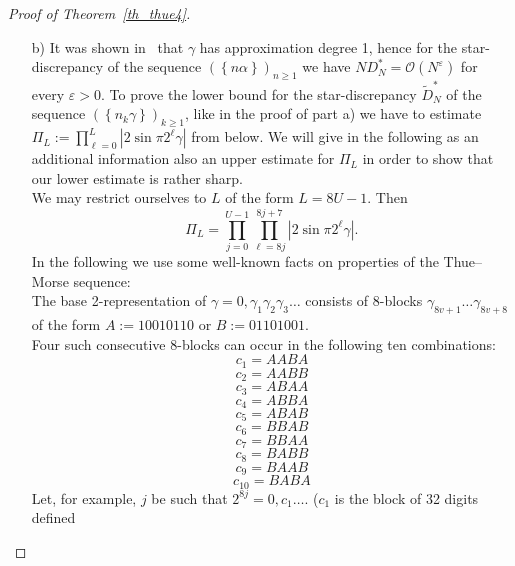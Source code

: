 \documentclass[12pt]{amsart}
\newcommand {\ve} {\varepsilon}
\begin{document}
\begin{proof}[Proof of Theorem~\ref{th_thue4}]
\begin{enumerate}
\noindent Because of $\left|\cos \pi x -1\right| \leq 3x$ and $\left|\sin \pi x\right| \leq \pi x$ for $x \geq 0$ we have 
$$
\left|\cos \pi \delta_{\ell} + \frac{\left(-1\right)^{\ell+1}}{\sqrt{3}} \sin \pi \delta_{\ell} \right| \geq 1- \left(3+ \frac{\pi}{\sqrt{3}}\right) \delta_{\ell} > 1- 5 \delta_{\ell}.
$$
Therefore, noting that $\max (0.2, ~1-5x) > e^{-11x}$ for $x >0$, we also have
\begin{eqnarray*}
\prod^{L}_{\ell=0} \frac{\left|\sin \pi 2^{\ell} \alpha\right|}{\left|\sin \frac{\pi}{3}\right|} & > & \prod^{L}_{\ell=0} \max \left(0.2, ~1-5 \delta_{\ell}\right) \\
& > & e^{-11 \sum^{L}_{\ell=0} \delta_{\ell}} \\
& \gg & e^{-22 \log L}.
\end{eqnarray*}
So
$$
\Pi_{L} \gg \frac{1}{L^{22}} N^{\frac{\log 3}{\log 4}} \gg \frac{1}{\left(\log N\right)^{22}} N^{\frac{\log3}{\log 4}}
$$
and the lower bound for $\widetilde{D}^{*}_{N}$ follows. The upper bound for $\widetilde{D}^{*}_{N}$ follows from~\eqref{BL2} and from the upper bound for $D^{*}_{N}$.\\

\item [b)] It was shown in~\cite{YB} that $\gamma$ has approximation degree 1, hence for the star-discrepancy of the sequence $\left(\left\{n \alpha \right\}\right)_{n \geq 1}$ we have $N D_{N}^{*} = \mathcal{O} \left(N^{\ve}\right)$ for every $\ve >0.$ To prove the lower bound for the star-discrepancy $\widetilde{D}_{N}^{*}$ of the sequence $\left(\left\{n_{k} \gamma\right\}\right)_{k \geq 1}$, like in the proof of part a) we have to estimate $\Pi_{L} := \prod^{L}_{\ell=0} \left|2 \sin \pi 2^{\ell} \gamma \right|$ from below. We will give in the following as an additional information also an upper estimate for $\Pi_{L}$ in order to show that our lower estimate is rather sharp.\\
We may restrict ourselves to $L$ of the form $L= 8 U -1$. Then
$$
\Pi_{L} = \prod^{U-1}_{j=0} \prod^{8j +7}_{\ell=8 j} \left|2 \sin \pi 2^{\ell} \gamma\right|.
$$
In the following we use some well-known facts on properties of the Thue--Morse sequence:\\
The base 2-representation of $\gamma=0,\gamma_{1} \gamma_{2} \gamma_{3} \ldots$ consists of 8-blocks $\gamma_{8 v+1} \ldots \gamma_{8 v+8}$ of the form $A:= 10010110$ or $B:= 01101001.$\\

\noindent Four such consecutive 8-blocks can occur in the following ten combinations:
$$c_{1} = AABA$$
$$c_{2} = AABB$$
$$c_{3} = ABAA$$
$$c_{4} = ABBA$$
$$c_{5} = ABAB$$
$$c_{6} = BBAB$$
$$c_{7} = BBAA$$
$$c_{8} = BABB$$
$$c_{9} = BAAB$$
$$c_{10} = BABA$$
Let, for example, $j$ be such that $2^{8 j} = 0,c_{1} \ldots.$ \quad ($c_{1}$ is the block of 32 digits defined


\end{enumerate}
\end{proof}
\end{document}

